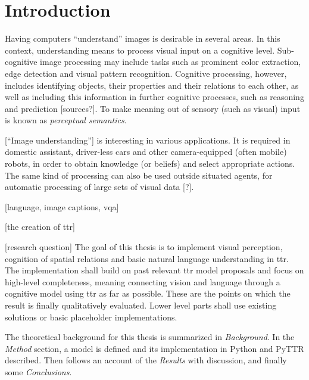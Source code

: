 \glsresetall
\section{Introduction}
\label{sec:intro}

Having computers ``understand'' images is desirable in several areas.
In this context, understanding means to process visual input on a cognitive level.
Sub-cognitive image processing may include tasks such as prominent color extraction, edge detection and visual pattern recognition.
Cognitive processing, however, includes identifying objects, their properties and their relations to each other, as well as including this information in further cognitive processes, such as reasoning and prediction [sources?].
To make meaning out of sensory (such as visual) input is known as \textit{perceptual semantics}.

[``Image understanding''] is interesting in various applications.
It is required in domestic assistant, driver-less cars and other camera-equipped (often mobile) robots, in order to obtain knowledge (or beliefs) and select appropriate actions.
The same kind of processing can also be used outside situated agents, for automatic processing of large sets of visual data [?].

[language, image captions, vqa]

[the creation of ttr]

[research question]
The goal of this thesis is to implement visual perception, cognition of spatial relations and basic natural language understanding in \gls{ttr}.
The implementation shall build on past relevant \gls{ttr} model proposals and focus on high-level completeness, meaning connecting vision and language through a cognitive model using \gls{ttr} as far as possible.
These are the points on which the result is finally qualitatively evaluated.
Lower level parts shall use existing solutions or basic placeholder implementations.

The theoretical background for this thesis is summarized in \textit{Background}.
In the \textit{Method} section, a model is defined and its implementation in Python and PyTTR described.
Then follows an account of the \textit{Results} with discussion, and finally some \textit{Conclusions}.